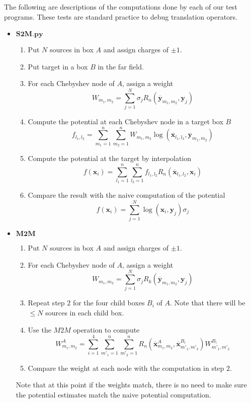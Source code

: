 \documentclass[11pt, oneside]{article}   	%
\begin{document}
\begin{appendices}
The following are descriptions of the computations done by each of our test programs. These tests are standard practice to debug translation operators.
\begin{itemize}
\item $\mathbf{S2M.py}$
\begin{enumerate}
\item Put $N$ sources in box $A$ and assign charges of $\pm 1$.
\item Put target in a box $B$ in the far field.
\item For each Chebyshev node of $A$, assign a weight\\
$$W_{m_1,m_2}=\sum_{j=1}^N \sigma_j R_n(\mathbf{\overline{y}}_{m_1,m_2},\mathbf{y}_j)$$
\item Compute the potential at each Chebyshev node in a target box $B$\\
$$f_{l_1,l_2}=\sum_{m_1=1}^n\sum_{m_2=1}^n W_{m_1,m_2} \log(\mathbf{\overline{x}}_{l_1,l_2},\mathbf{\overline{y}}_{m_1,m_2})$$
\item Compute the potential at the target by interpolation\\
$$f(\mathbf{x}_i)=\sum_{l_1=1}^n\sum_{l_2=1}^n f_{l_1,l_2} R_n(\mathbf{\overline{x}}_{l_1,l_2},\mathbf{x}_i)$$
\item Compare the result with the naive computation of the potential\\
$$f(\mathbf{x}_i)=\sum_{j=1}^N \log(\mathbf{x}_i,\mathbf{y}_j) \sigma_j$$
\end{enumerate}

\item $\mathbf{M2M}$
\begin{enumerate}
\item Put $N$ sources in box $A$ and assign charges of $\pm 1$.
\item For each Chebyshev node of $A$, assign a weight\\
$$W_{m_1,m_2}=\sum_{j=1}^N \sigma_jR_k(\mathbf{\overline{y}}_{m_1,m_2},\mathbf{y}_j)$$
\item Repeat step $2$ for the four child boxes $B_i$ of $A$. Note that there will be $\le N$ sources in each child box.
\item Use the $M2M$ operation to compute\\
$$W^A_{m_1,m_2}= \sum_{i=1}^4\sum_{m'_1=1}^n\sum_{m'_2=1}^n R_n(\mathbf{\overline{x}}^{A}_{m_1,m_2},\mathbf{\overline{x}}^{B_i}_{m'_1,m'_2})W^{B_i}_{m'_1,m'_2}$$
\item Compare the weight at each node with the computation in step $2$.
\end{enumerate}
Note that at this point if the weights match, there is no need to make sure the potential estimates match the naive potential computation.\\


\end{itemize}
\end{appendices}
\end{document}
